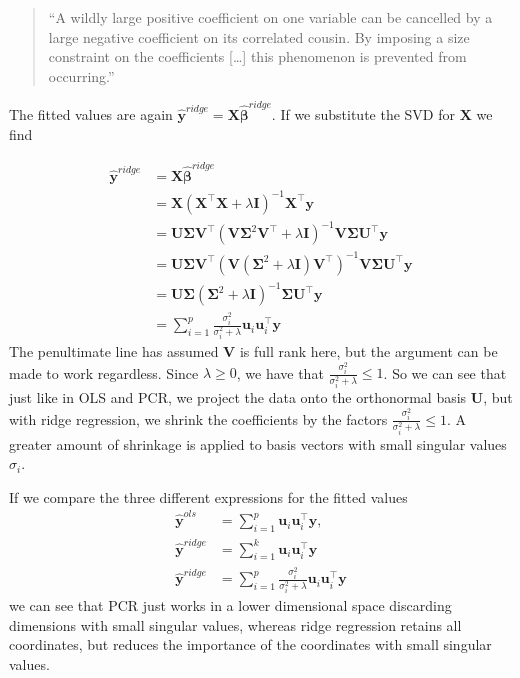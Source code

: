 \documentclass[
]{book}
\theoremstyle{definition}
\theoremstyle{definition}
\theoremstyle{definition}
\theoremstyle{definition}
\theoremstyle{remark}
\begin{document}
\begin{quote}
``A wildly large positive coefficient on one variable can be cancelled by a large negative coefficient on its correlated cousin. By imposing a size constraint on the coefficients {[}\ldots{]} this phenomenon is prevented from occurring.''
\end{quote}

The fitted values are again \(\hat{\mathbf y}^{ridge} = \mathbf X\hat{\boldsymbol \beta}^{ridge}\).
If we substitute the SVD for \(\mathbf X\) we find

\begin{align*}
\hat{\mathbf y}^{ridge}&=\mathbf X\hat{\boldsymbol \beta}^{ridge}\\
&=\mathbf X(\mathbf X^\top \mathbf X+ \lambda\mathbf I)^{-1}\mathbf X^\top \mathbf y\\
&=\mathbf U\boldsymbol{\Sigma}\mathbf V^\top(\mathbf V\boldsymbol{\Sigma}^2 \mathbf V^\top +\lambda\mathbf I)^{-1}\mathbf V\boldsymbol{\Sigma}\mathbf U^\top \mathbf y\\
&=\mathbf U\boldsymbol{\Sigma}\mathbf V^\top(\mathbf V(\boldsymbol{\Sigma}^2  +\lambda\mathbf I)\mathbf V^\top)^{-1}\mathbf V\boldsymbol{\Sigma}\mathbf U^\top \mathbf y\\
&=\mathbf U\boldsymbol{\Sigma}(\boldsymbol{\Sigma}^2  +\lambda\mathbf I)^{-1}\boldsymbol{\Sigma}\mathbf U^\top \mathbf y\\
&= \sum_{i=1}^p \frac{\sigma^2_i}{\sigma^2_i+\lambda} \mathbf u_i \mathbf u_i^\top \mathbf y
\end{align*}
The penultimate line has assumed \(\mathbf V\) is full rank here, but the argument can be made to work regardless. Since \(\lambda\geq 0\), we have that \(\frac{\sigma^2_i}{\sigma^2_i+\lambda}\leq 1\). So we can see that just like in OLS and PCR, we project the data onto the orthonormal basis \(\mathbf U\), but with ridge regression, we shrink the coefficients by the factors \(\frac{\sigma^2_i}{\sigma^2_i+\lambda}\leq 1\). A greater amount of shrinkage is applied to basis vectors with small singular values \(\sigma_i\).

If we compare the three different expressions for the fitted values
\begin{align*}
\hat{\mathbf y}^{ols}&=\sum_{i=1}^p \mathbf u_i \mathbf u_i^\top \mathbf y,\\
\hat{\mathbf y}^{ridge}&=\sum_{i=1}^k \mathbf u_i \mathbf u_i^\top \mathbf y\\
\hat{\mathbf y}^{ridge}&=\sum_{i=1}^p \frac{\sigma^2_i}{\sigma^2_i+\lambda} \mathbf u_i \mathbf u_i^\top \mathbf y
\end{align*}
we can see that PCR just works in a lower dimensional space discarding dimensions with small singular values, whereas ridge regression retains all coordinates, but reduces the importance of the coordinates with small singular values.
\end{document}
